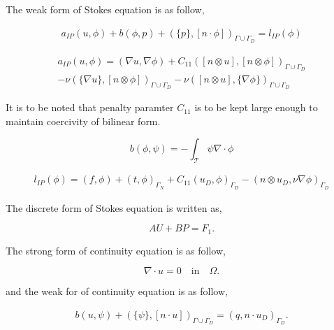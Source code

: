 \documentclass[a4paper,12pt]{book}
\begin{document}
The weak form of Stokes equation is as follow,

\begin{equation}\label{stokes_weak_ch3}
\begin{split}
a_{IP}(u,\phi) + b(\phi,p) + (\{p\},[n\cdot \phi])_{\Gamma \cup \Gamma_D} = l_{IP}(\phi) 
\end{split}
\end{equation}

\begin{equation}
\begin{split}
a_{IP}(u,\phi) = (\nabla u, \nabla \phi) + C_{11} ([n \otimes u],[n \otimes \phi])_{\Gamma \cup \Gamma_D} \\
- \nu (\{\nabla u\},[n \otimes \phi])_{\Gamma \cup \Gamma_D} - \nu ([n \otimes u],\{\nabla \phi\})_{\Gamma \cup \Gamma_D}
\end{split}
\end{equation}

It is to be noted that penalty paramter $C_{11}$ is to be kept large enough to maintain coercivity of bilinear form.

\begin{equation}
b(\phi,\psi) = -\int_{\mathcal{T}} \psi \nabla \cdot \phi
\end{equation}

\begin{equation}
\begin{split}
l_{IP}(\phi) = (f,\phi) + (t,\phi)_{\Gamma_N} + C_{11} (u_D,\phi)_{\Gamma_D} - (n \otimes u_D, \nu \nabla \phi)_{\Gamma_D}
\end{split}
\end{equation}

The discrete form of Stokes equation is written as,

\begin{equation} \label{stokes discrete_ch3}
AU + BP = F_1 \textrm{.}
\end{equation}

The strong form of continuity equation is as follow,

\begin{equation}
\nabla \cdot u = 0 \quad \textrm{in} \quad \Omega \textrm{.}
\end{equation}

and the weak for of continuity equation is as follow,

\begin{equation}\label{contiuity_weak_ch3}
\begin{split}
b(u,\psi) + (\{\psi\},[n\cdot u])_{\Gamma \cup \Gamma_D} = (q,n\cdot u_D)_{\Gamma_D} \textrm{.}
\end{split}
\end{equation}
\end{document}
